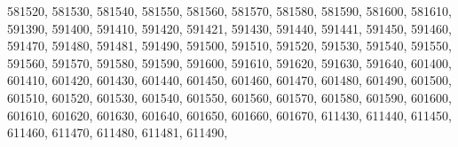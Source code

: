 \textquotesingle{}581520\textquotesingle{}, \textquotesingle{}581530\textquotesingle{}, \textquotesingle{}581540\textquotesingle{}, \textquotesingle{}581550\textquotesingle{}, \textquotesingle{}581560\textquotesingle{}, \textquotesingle{}581570\textquotesingle{}, \textquotesingle{}581580\textquotesingle{}, \textquotesingle{}581590\textquotesingle{}, \textquotesingle{}581600\textquotesingle{}, \textquotesingle{}581610\textquotesingle{}, \textquotesingle{}591390\textquotesingle{}, \textquotesingle{}591400\textquotesingle{}, \textquotesingle{}591410\textquotesingle{}, \textquotesingle{}591420\textquotesingle{}, \textquotesingle{}591421\textquotesingle{}, \textquotesingle{}591430\textquotesingle{}, \textquotesingle{}591440\textquotesingle{}, \textquotesingle{}591441\textquotesingle{}, \textquotesingle{}591450\textquotesingle{}, \textquotesingle{}591460\textquotesingle{}, \textquotesingle{}591470\textquotesingle{}, \textquotesingle{}591480\textquotesingle{}, \textquotesingle{}591481\textquotesingle{}, \textquotesingle{}591490\textquotesingle{}, \textquotesingle{}591500\textquotesingle{}, \textquotesingle{}591510\textquotesingle{}, \textquotesingle{}591520\textquotesingle{}, \textquotesingle{}591530\textquotesingle{}, \textquotesingle{}591540\textquotesingle{}, \textquotesingle{}591550\textquotesingle{}, \textquotesingle{}591560\textquotesingle{}, \textquotesingle{}591570\textquotesingle{}, \textquotesingle{}591580\textquotesingle{}, \textquotesingle{}591590\textquotesingle{}, \textquotesingle{}591600\textquotesingle{}, \textquotesingle{}591610\textquotesingle{}, \textquotesingle{}591620\textquotesingle{}, \textquotesingle{}591630\textquotesingle{}, \textquotesingle{}591640\textquotesingle{}, \textquotesingle{}601400\textquotesingle{}, \textquotesingle{}601410\textquotesingle{}, \textquotesingle{}601420\textquotesingle{}, \textquotesingle{}601430\textquotesingle{}, \textquotesingle{}601440\textquotesingle{}, \textquotesingle{}601450\textquotesingle{}, \textquotesingle{}601460\textquotesingle{}, \textquotesingle{}601470\textquotesingle{}, \textquotesingle{}601480\textquotesingle{}, \textquotesingle{}601490\textquotesingle{}, \textquotesingle{}601500\textquotesingle{}, \textquotesingle{}601510\textquotesingle{}, \textquotesingle{}601520\textquotesingle{}, \textquotesingle{}601530\textquotesingle{}, \textquotesingle{}601540\textquotesingle{}, \textquotesingle{}601550\textquotesingle{}, \textquotesingle{}601560\textquotesingle{}, \textquotesingle{}601570\textquotesingle{}, \textquotesingle{}601580\textquotesingle{}, \textquotesingle{}601590\textquotesingle{}, \textquotesingle{}601600\textquotesingle{}, \textquotesingle{}601610\textquotesingle{}, \textquotesingle{}601620\textquotesingle{}, \textquotesingle{}601630\textquotesingle{}, \textquotesingle{}601640\textquotesingle{}, \textquotesingle{}601650\textquotesingle{}, \textquotesingle{}601660\textquotesingle{}, \textquotesingle{}601670\textquotesingle{}, \textquotesingle{}611430\textquotesingle{}, \textquotesingle{}611440\textquotesingle{}, \textquotesingle{}611450\textquotesingle{}, \textquotesingle{}611460\textquotesingle{}, \textquotesingle{}611470\textquotesingle{}, \textquotesingle{}611480\textquotesingle{}, \textquotesingle{}611481\textquotesingle{}, \textquotesingle{}611490\textquotesingle{}, 